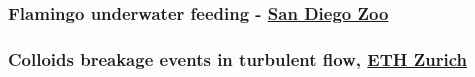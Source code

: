     \begin{frame}[label=app-2a]
    \frametitle{Flamingo underwater feeding - \href{https://www.dropbox.com/s/ic0l5npzon834l9/flamingo.mp4?raw=1}{San Diego Zoo}}
    \begin{center}
    \end{center}
    \end{frame}
    
    
\begin{frame}[label=app-31]
    \frametitle{Colloids breakage events in turbulent flow, \href{https://www.dropbox.com/s/aufwfraotj5rll7/colloids1.mp4?raw=1}{ETH Zurich}}
\end{frame}
    
